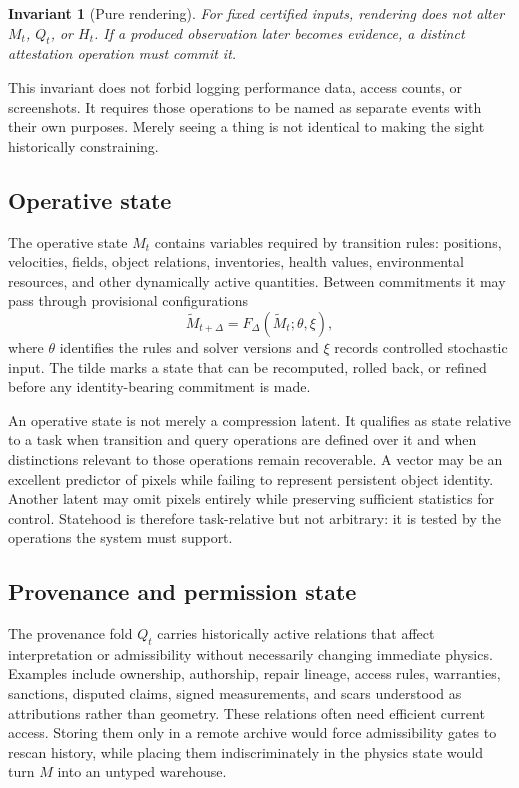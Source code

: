 \documentclass[11pt]{article}
\newtheorem{invariant}{Invariant}
\begin{document}
\begin{invariant}[Pure rendering]
For fixed certified inputs, rendering does not alter $M_t$, $Q_t$, or $H_t$. If a produced observation later becomes evidence, a distinct attestation operation must commit it.
\end{invariant}

This invariant does not forbid logging performance data, access counts, or screenshots. It requires those operations to be named as separate events with their own purposes. Merely seeing a thing is not identical to making the sight historically constraining.

\subsection{Operative state}

The operative state $M_t$ contains variables required by transition rules: positions, velocities, fields, object relations, inventories, health values, environmental resources, and other dynamically active quantities. Between commitments it may pass through provisional configurations
\[
\widetilde{M}_{t+\Delta}=F_{\Delta}(\widetilde{M}_t;\theta,\xi),
\]
where $\theta$ identifies the rules and solver versions and $\xi$ records controlled stochastic input. The tilde marks a state that can be recomputed, rolled back, or refined before any identity-bearing commitment is made.

An operative state is not merely a compression latent. It qualifies as state relative to a task when transition and query operations are defined over it and when distinctions relevant to those operations remain recoverable. A vector may be an excellent predictor of pixels while failing to represent persistent object identity. Another latent may omit pixels entirely while preserving sufficient statistics for control. Statehood is therefore task-relative but not arbitrary: it is tested by the operations the system must support.

\subsection{Provenance and permission state}

The provenance fold $Q_t$ carries historically active relations that affect interpretation or admissibility without necessarily changing immediate physics. Examples include ownership, authorship, repair lineage, access rules, warranties, sanctions, disputed claims, signed measurements, and scars understood as attributions rather than geometry. These relations often need efficient current access. Storing them only in a remote archive would force admissibility gates to rescan history, while placing them indiscriminately in the physics state would turn $M$ into an untyped warehouse.
\end{document}
